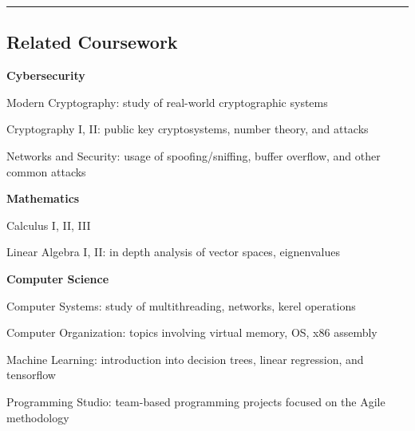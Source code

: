 \documentclass[10pt,letterpaper]{article}
\newenvironment{indentsection}[1]%
{\begin{list}{}%
	{\setlength{\leftmargin}{#1}}%
	\item[]%
}
{\end{list}}
\begin{document}
\ifdraft
\hrule
\vspace{-0.8em}
\subsection*{Related Coursework}
	\begin{indentsection}{\parindent}
		\begin{itemize*}
		\item \textbf{Cybersecurity} 
		\vspace{-0.2em}
			\begin{itemize*}
				\item Modern Cryptography: study of real-world cryptographic systems
				\item Cryptography I, II: public key cryptosystems, number theory, and attacks
				\item Networks and Security: usage of spoofing/sniffing, buffer overflow, and other common attacks
			\end{itemize*}
		\item \textbf{Mathematics} 
		\vspace{-0.2em}
			\begin{itemize*}
				\item Calculus I, II, III
				\item Linear Algebra I, II: in depth analysis of vector spaces, eignenvalues
			\end{itemize*}
		\item \textbf{Computer Science}
		\vspace{-0.2em}
			\begin{itemize*}
				\item Computer Systems: study of multithreading, networks, kerel operations
				\item Computer Organization: topics involving virtual memory, OS, x86 assembly
				\item Machine Learning: introduction into decision trees, linear regression, and tensorflow
				\item Programming Studio: team-based programming projects focused on the Agile methodology 
			\end{itemize*}
		\end{itemize*}
	\end{indentsection}
\else 
\end{document}
